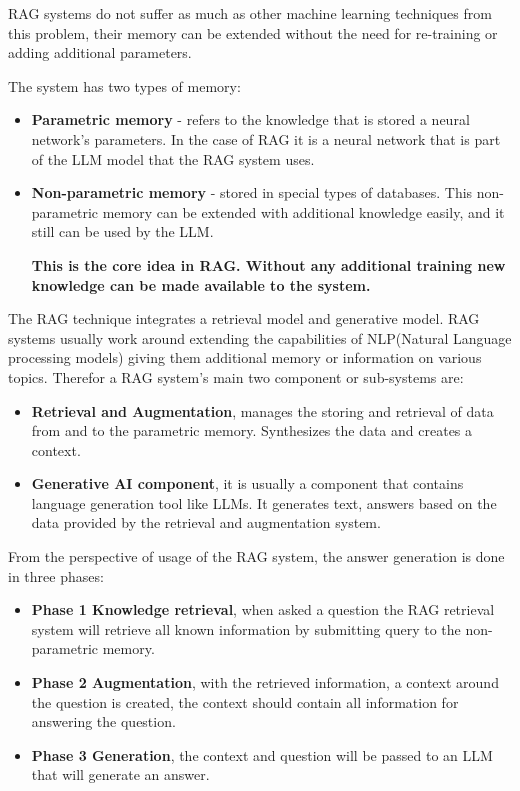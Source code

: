 \documentclass{wseas}
\begin{document}
RAG systems do not suffer as much as other machine learning techniques 
from this problem, their memory can be extended without the need for 
re-training or adding additional parameters. 

The system has two types of memory:

\begin{itemize}

\item
  \textbf{Parametric memory} - refers to the knowledge that is stored a neural network's parameters.
  In the case of RAG it is a neural network that is part of the LLM model that the RAG system uses.
\item
  \textbf{Non-parametric memory} - stored in special types of databases.
  This non-parametric memory can be extended with additional knowledge
  easily, and it still can be used by the LLM.

  \textbf{This is the core
  idea in RAG. Without any additional training new knowledge can be made
  available to the system.}
\end{itemize}

The RAG technique integrates a retrieval model and generative model. RAG
systems usually work around extending the capabilities of NLP(Natural
Language processing models) giving them additional memory or information
on various topics. Therefor a RAG system's main two component or sub-systems are:

\begin{itemize}

\item
  \textbf{Retrieval and Augmentation}, manages the storing and retrieval of 
  data from and to the parametric memory. Synthesizes the data and creates a context.
\item
  \textbf{Generative AI component}, it is usually a component that contains
  language generation tool like LLMs. It generates text, answers based on the data 
  provided by the retrieval and augmentation system.
\end{itemize}

From the perspective of usage of the RAG system, the answer generation is
done in three phases:

\begin{itemize}
\item
  \textbf{Phase 1 Knowledge retrieval}, when asked a question the RAG
  retrieval system will retrieve all known information by submitting query 
  to the non-parametric memory.
\item
  \textbf{Phase 2 Augmentation}, with the retrieved information, a context around
  the question is created, the context should contain all information
  for answering the question.
\item
  \textbf{Phase 3 Generation}, the context and question will be passed to an LLM
  that will generate an answer.
\end{itemize}
\end{document}
